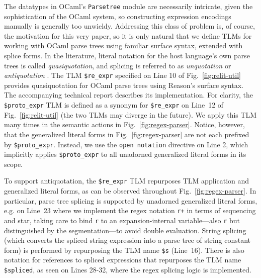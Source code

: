 \documentclass[acmsmall]{acmart}
\newcommand{\li}[1]{\lstinline[basicstyle=\ttfamily\fontsize{9pt}{1em}\selectfont]{#1}}
\begin{document}
The datatypes in OCaml's \li{Parsetree} module are necessarily intricate, given the sophistication of the OCaml system, so constructing expression encodings manually is generally too unwieldy. Addressing this class of problem is, of course, the motivation for this very paper, so it is only natural that we define TLMs  for working with OCaml parse trees using familiar surface syntax, extended with splice forms. In the literature, literal notation for the host language's own parse trees is called \emph{quasiquotation}, and splicing is referred to as \emph{unquotation} or \emph{antiquotation} \cite{Bawd99a,shabalin2013quasiquotes,mainland2007s}. The TLM \li{$re_expr}  specified on Line 10 of Fig.~\ref{fig:relit-util} provides quasiquotation for OCaml parse trees using Reason's surface syntax. The accompanying technical report describes its implementation. For clarity, the \li{$proto_expr} TLM is defined as a synonym for \li{$re_expr} on Line~12 of Fig.~\ref{fig:relit-util} (the two TLMs may diverge in the future). We apply this TLM many times in the semantic actions in Fig.~\ref{fig:regex-parser}. Notice, however, that the generalized literal forms in Fig.~\ref{fig:regex-parser} are not each prefixed by \li{$proto_expr}. Instead, we use the \li{open notation} directive on Line 2, which implicitly applies \li{$proto_expr} to all unadorned generalized literal forms in its scope. 

To support antiquotation, the \li{$re_expr} TLM repurposes TLM application and generalized literal forms, as can be observed throughout Fig.~\ref{fig:regex-parser}. In particular, parse tree splicing is supported by unadorned generalized literal forms, e.g. on Line~23 where we implement the regex notation \li{r+} in terms of sequencing and star, taking care to bind \li{r} to an expansion-internal variable---also \li{r} but distinguished by the segmentation---to avoid double evaluation. String splicing (which converts the spliced string expression into a parse tree of string constant form) is performed by repurposing the TLM name \li{$s} (Line~16). There is also notation for references to spliced expressions that repurposes the TLM name \li{$spliced}, as seen on Lines 28-32, where the regex splicing logic is implemented. 
\end{document}
